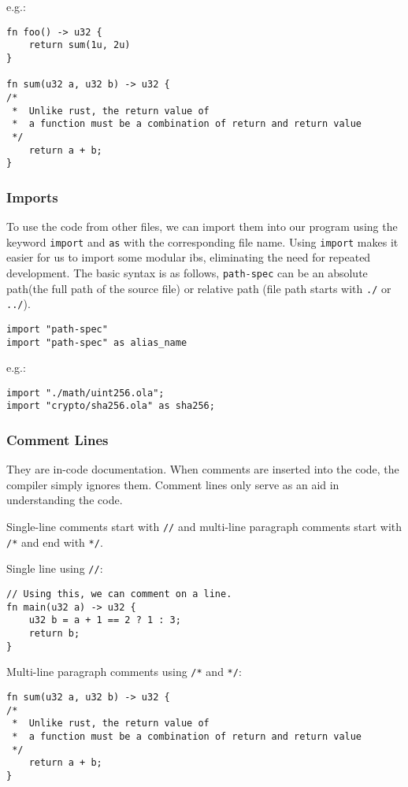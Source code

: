 e.g.:

\begin{lstlisting}
fn foo() -> u32 {
    return sum(1u, 2u)
}

fn sum(u32 a, u32 b) -> u32 {
/* 
 *  Unlike rust, the return value of 
 *  a function must be a combination of return and return value
 */
    return a + b;
}
\end{lstlisting}

\subsubsection{Imports}

To use the code from other files, we can import them into our program using the keyword \verb|import| and \verb|as| with the corresponding file name.
Using \verb|import| makes it easier for us to import some modular ibs, eliminating the need for repeated development.
The basic syntax is as follows, \verb|path-spec| can be an absolute path(the full path of the source file) or relative path (file path starts with \verb|./| or \verb|../|).

\begin{lstlisting}
import "path-spec"
import "path-spec" as alias_name
\end{lstlisting}

e.g.:

\begin{lstlisting}
import "./math/uint256.ola";
import "crypto/sha256.ola" as sha256;
\end{lstlisting}

\subsubsection{Comment Lines}

They are in-code documentation. When comments are inserted into the code, the compiler simply ignores them. Comment lines only serve as an aid in understanding the code.

Single-line comments start with \texttt{//} and multi-line paragraph comments start with \texttt{/*} and end with \texttt{*/}.

Single line using \texttt{//}:
\begin{lstlisting}
// Using this, we can comment on a line.
fn main(u32 a) -> u32 {
    u32 b = a + 1 == 2 ? 1 : 3;
    return b;
}
\end{lstlisting}

Multi-line paragraph comments using \texttt{/*} and \texttt{*/}:
\begin{lstlisting}
fn sum(u32 a, u32 b) -> u32 {
/* 
 *  Unlike rust, the return value of 
 *  a function must be a combination of return and return value
 */
    return a + b;
}
\end{lstlisting}



